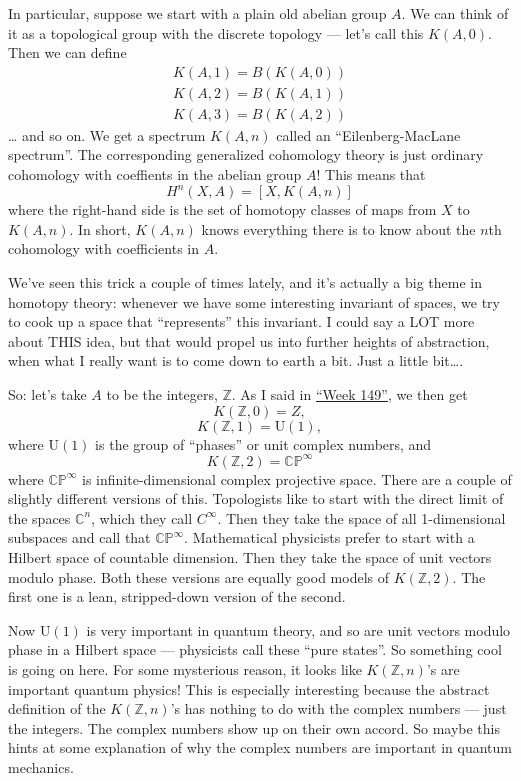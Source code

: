 \documentclass{article}
\begin{document}
In particular, suppose we start with a plain old abelian group \(A\). We
can think of it as a topological group with the discrete topology ---
let's call this \(K(A,0)\). Then we can define \[
  \begin{gathered}
    K(A,1) = B(K(A,0))
  \\K(A,2) = B(K(A,1))
  \\K(A,3) = B(K(A,2))
  \end{gathered}
\] \ldots{} and so on. We get a spectrum \(K(A,n)\) called an
``Eilenberg-MacLane spectrum''. The corresponding generalized cohomology
theory is just ordinary cohomology with coeffients in the abelian group
\(A\)! This means that \[H^n(X,A) = [X, K(A,n)]\] where the right-hand
side is the set of homotopy classes of maps from \(X\) to \(K(A,n)\). In
short, \(K(A,n)\) knows everything there is to know about the \(n\)th
cohomology with coefficients in \(A\).

We've seen this trick a couple of times lately, and it's actually a big
theme in homotopy theory: whenever we have some interesting invariant of
spaces, we try to cook up a space that ``represents'' this invariant. I
could say a LOT more about THIS idea, but that would propel us into
further heights of abstraction, when what I really want is to come down
to earth a bit. Just a little bit\ldots.

So: let's take \(A\) to be the integers, \(\mathbb{Z}\). As I said in
\protect\hyperlink{week149}{``Week 149''}, we then get
\[K(\mathbb{Z},0) = Z,\] \[K(\mathbb{Z},1) = \mathrm{U}(1),\] where
\(\mathrm{U}(1)\) is the group of ``phases'' or unit complex numbers,
and \[K(\mathbb{Z},2) = \mathbb{CP}^\infty\] where
\(\mathbb{CP}^\infty\) is infinite-dimensional complex projective space.
There are a couple of slightly different versions of this. Topologists
like to start with the direct limit of the spaces \(\mathbb{C}^n\),
which they call \(C^\infty\). Then they take the space of all
1-dimensional subspaces and call that \(\mathbb{CP}^\infty\).
Mathematical physicists prefer to start with a Hilbert space of
countable dimension. Then they take the space of unit vectors modulo
phase. Both these versions are equally good models of
\(K(\mathbb{Z},2)\). The first one is a lean, stripped-down version of
the second.

Now \(\mathrm{U}(1)\) is very important in quantum theory, and so are
unit vectors modulo phase in a Hilbert space --- physicists call these
``pure states''. So something cool is going on here. For some mysterious
reason, it looks like \(K(\mathbb{Z},n)\)'s are important quantum
physics! This is especially interesting because the abstract definition
of the \(K(\mathbb{Z},n)\)'s has nothing to do with the complex numbers
--- just the integers. The complex numbers show up on their own accord.
So maybe this hints at some explanation of why the complex numbers are
important in quantum mechanics.
\end{document}

